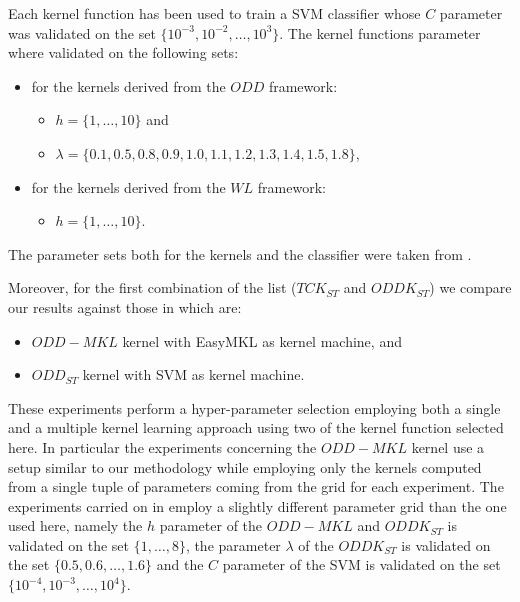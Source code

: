 Each kernel function has been used to train a SVM classifier whose $C$ parameter
was validated on the set $\{10^{-3},10^{-2},\dots,10^3\}$.
The kernel functions parameter where validated on the following sets:
\begin{itemize}
    \item for the kernels derived from the $ODD$ framework:
    \begin{itemize}
        \item $h=\{1,\dots,10\}$ and 
        \item $\lambda=\{0.1, 0.5, 0.8, 0.9, 1.0, 1.1, 1.2, 1.3, 1.4, 1.5, 1.8\}$,
    \end{itemize}
    \item for the kernels derived from the $WL$ framework:
    \begin{itemize}
        \item $h=\{1,\dots,10\}$.
    \end{itemize}
\end{itemize}
The parameter sets both for the kernels and the classifier were taken from \cite{rtesselli}.

Moreover, for the first combination of the list ($TCK_{ST}$ and $ODDK_{ST}$)
we compare our results against those in \cite{gmkl} which are:

\begin{itemize}
    \item $ODD-MKL$ kernel with EasyMKL as kernel machine, and
    \item $ODD_{ST}$ kernel with SVM as kernel machine.
\end{itemize}

These experiments perform a hyper-parameter selection employing both a single and 
a multiple kernel learning approach using two of the kernel function selected here.
In particular the experiments concerning the $ODD-MKL$ kernel use a setup similar to
our methodology while employing only the kernels computed from a single tuple of
parameters coming from the grid for each experiment.
The experiments carried on in \cite{gmkl} employ a slightly different parameter grid
than the one used here, namely the $h$ parameter of the $ODD-MKL$ and $ODDK_{ST}$ is
validated on the set $\{1,\dots,8\}$, the parameter $\lambda$ of the $ODDK_{ST}$ is 
validated on the set $\{0.5,0.6,\dots,1.6\}$ and the $C$ parameter of the SVM
is validated on the set $\{10^{-4},10^{-3},\dots,10^4\}$.

